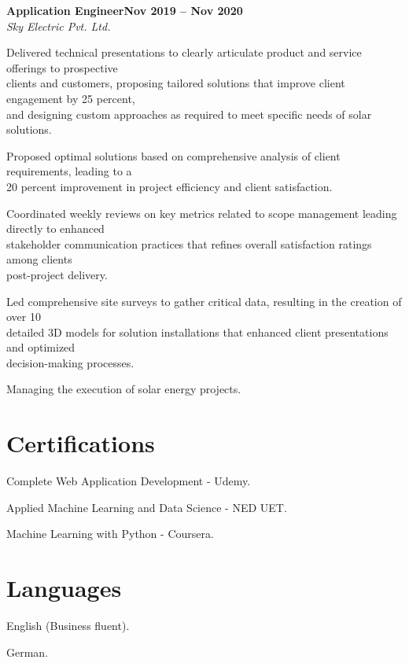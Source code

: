 \documentclass[letterpaper,10pt]{article}
\newcommand{\heading}[2]{
  \hspace{10pt}#1\hfill#2\\
}
\newcommand{\headingBf}[2]{
  \heading{\textbf{#1}}{\textbf{#2}}
}
\newcommand{\headingIt}[2]{
  \heading{\textit{#1}}{\textit{#2}}
}
\newenvironment{resume_list}{
  \vspace{-7pt}
  \begin{itemize}[itemsep=-2px, parsep=1pt, leftmargin=30pt]
}{
  \end{itemize}
}
\begin{document}
\headingBf{Application Engineer}{Nov 2019 -- Nov 2020}
\headingIt{Sky Electric Pvt. Ltd.}{}
\begin{resume_list}
    \item Delivered technical presentations to clearly articulate product and service offerings to prospective \\clients and customers, proposing tailored solutions that improve client engagement by 25 percent, \\and designing custom approaches as required to meet specific needs of solar solutions.
    \item Proposed optimal solutions based on comprehensive analysis of client requirements, leading to a \\20 percent improvement in project efficiency and client satisfaction.
    \item Coordinated weekly reviews on key metrics related to scope management leading directly to enhanced \\stakeholder communication practices that refines overall satisfaction ratings among clients \\post-project delivery.
    \item Led comprehensive site surveys to gather critical data, resulting in the creation of over 10\\ detailed 3D models for solution installations that enhanced client presentations and optimized \\decision-making processes.
    \item Managing the execution of solar energy projects.
\end{resume_list}

\section{Certifications}


\begin{resume_list}
    \item Complete Web Application Development - Udemy.
    \item Applied Machine Learning and Data Science - NED UET.
    \item Machine Learning with Python - Coursera.
\end{resume_list}

\section{Languages}


\begin{resume_list}
    \item English (Business fluent).
    \item German.
\end{resume_list}
\end{document}
